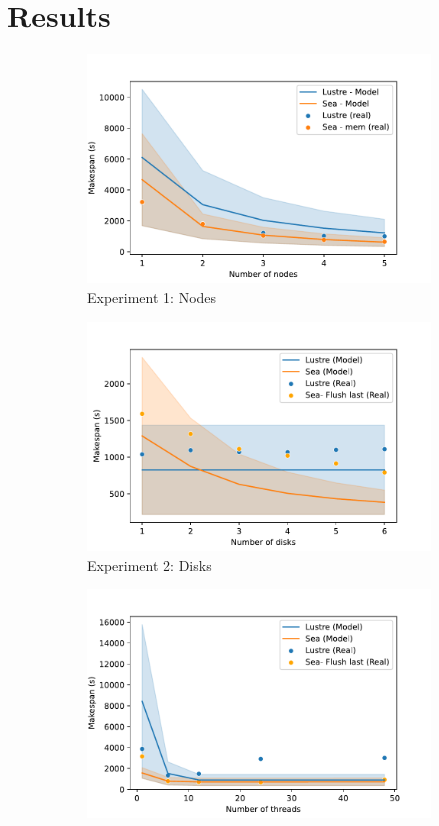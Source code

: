 \documentclass{report}
\begin{document}
    \section{Results}\label{results}
    \begin{figure}
        \begin{subfigure}{0.5\textwidth}
            \centering
            \includegraphics[width=0.8\linewidth]{figures/nodes.pdf}
            \caption{Experiment 1: Nodes}
            \label{fig:nodes}
        \end{subfigure}%
        \begin{subfigure}{0.5\textwidth}
            \centering
            \includegraphics[width=0.8\linewidth]{figures/disks.pdf}
            \caption{Experiment 2: Disks}
            \label{fig:disks}
        \end{subfigure}
        \begin{subfigure}{0.5\textwidth}
            \centering
            \includegraphics[width=0.8\linewidth]{figures/threads.pdf}

\end{subfigure}
\end{figure}
\end{document}
